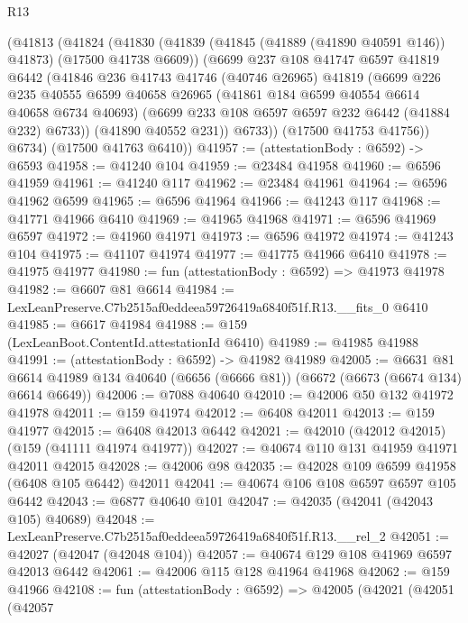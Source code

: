 \begin{lexlean}{R13}
\begin{coremodule}
      (@41813
        (@41824
          (@41830
            (@41839 (@41845 (@41889 (@41890 @40591 @146)) @41873) (@17500 @41738 @6609))
            (@6699
              @237
              @108
              @41747
              @6597
              @41819
              @6442
              (@41846
                @236
                @41743
                @41746
                (@40746 @26965)
                @41819
                (@6699
                  @226
                  @235
                  @40555
                  @6599
                  @40658
                  @26965
                  (@41861 @184 @6599 @40554 @6614 @40658 @6734 @40693)
                  (@6699 @233 @108 @6597 @6597 @232 @6442 (@41884 @232) @6733))
                (@41890 @40552 @231))
              @6733))
          (@17500 @41753 @41756))
        @6734)
      (@17500 @41763 @6410))
@41957 := (attestationBody : @6592) -> @6593
@41958 := @41240 @104
@41959 := @23484 @41958
@41960 := @6596 @41959
@41961 := @41240 @117
@41962 := @23484 @41961
@41964 := @6596 @41962 @6599
@41965 := @6596 @41964
@41966 := @41243 @117
@41968 := @41771 @41966 @6410
@41969 := @41965 @41968
@41971 := @6596 @41969 @6597
@41972 := @41960 @41971
@41973 := @6596 @41972
@41974 := @41243 @104
@41975 := @41107 @41974
@41977 := @41775 @41966 @6410
@41978 := @41975 @41977
@41980 := fun (attestationBody : @6592) => @41973 @41978
@41982 := @6607 @81 @6614
@41984 := LexLeanPreserve.C7b2515af0eddeea59726419a6840f51f.R13.__fits_0 @6410
@41985 := @6617 @41984
@41988 := @159 (LexLeanBoot.ContentId.attestationId @6410)
@41989 := @41985 @41988
@41991 := (attestationBody : @6592) -> @41982 @41989
@42005 := @6631
    @81
    @6614
    @41989
    @134
    @40640
    (@6656 (@6666 @81))
    (@6672 (@6673 (@6674 @134) @6614 @6649))
@42006 := @7088 @40640
@42010 := @42006 @50 @132 @41972 @41978
@42011 := @159 @41974
@42012 := @6408 @42011
@42013 := @159 @41977
@42015 := @6408 @42013 @6442
@42021 := @42010 (@42012 @42015) (@159 (@41111 @41974 @41977))
@42027 := @40674 @110 @131 @41959 @41971 @42011 @42015
@42028 := @42006 @98
@42035 := @42028 @109 @6599 @41958 (@6408 @105 @6442) @42011
@42041 := @40674 @106 @108 @6597 @6597 @105 @6442
@42043 := @6877 @40640 @101
@42047 := @42035 (@42041 (@42043 @105) @40689)
@42048 := LexLeanPreserve.C7b2515af0eddeea59726419a6840f51f.R13.__rel_2
@42051 := @42027 (@42047 (@42048 @104))
@42057 := @40674 @129 @108 @41969 @6597 @42013 @6442
@42061 := @42006 @115 @128 @41964 @41968
@42062 := @159 @41966
@42108 := fun (attestationBody : @6592) =>
  @42005
    (@42021
      (@42051
        (@42057

\end{coremodule}
\end{lexlean}
